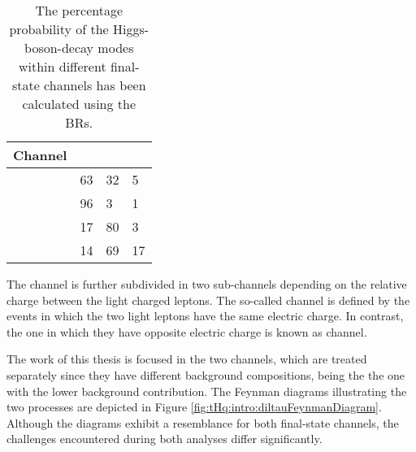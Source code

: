
\begin{table}[]
\centering
\begin{tabular}{l|lll}
\toprule
Channel  	& \Htautau & \HWW	& \HZZ \\
\midrule
\dileptau 	& 63      	& 32  	& 5   \\
\lepditau 	& 96      	& 3   		& 1   \\
\dilepSS  	& 17      	& 80  	& 3   \\
\trilep   	& 14      	& 69  	& 17 \\
\bottomrule	
\end{tabular}
\caption{The percentage probability of the Higgs-boson-decay modes 
within different final-state channels has been calculated using the BRs.}
\label{tab:ChaptH:tHqChannelsYields}
\end{table}

The \dileptau channel is further subdivided in two sub-channels depending 
on the relative charge between the light charged leptons.
The so-called \dilepSStau channel is defined by the events in which the two 
light leptons have the same electric charge. In contrast, the one in which they have opposite electric charge
is known as \dilepOStau channel. %

The work of this thesis is focused in the two \dileptau channels, which are
treated separately since they have different background compositions, being the \dilepSStau
the one with the lower background contribution. The Feynman diagrams illustrating the two 
processes are depicted in Figure \ref{fig:tHq:intro:diltauFeynmanDiagram}. Although the 
diagrams exhibit a resemblance for both final-state channels, the challenges encountered 
during both analyses differ significantly.

